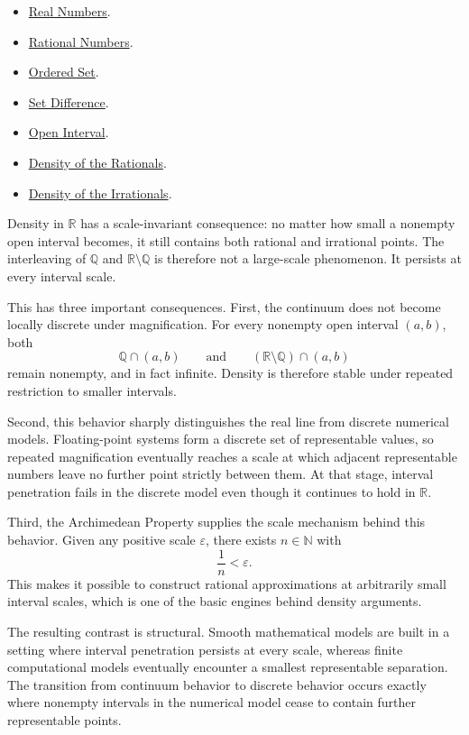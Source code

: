 \begin{dependencies}
\begin{itemize}
\item \hyperref[def:reals]{Real Numbers}.
\item \hyperref[def:rationals]{Rational Numbers}.
\item \hyperref[def:ordered-set]{Ordered Set}.
\item \hyperref[def:set-difference]{Set Difference}.
\item \hyperref[def:open-interval]{Open Interval}.
\item \hyperref[thm:density-of-rationals-in-reals]{Density of the Rationals}.
\item \hyperref[thm:density-of-irrationals-in-reals]{Density of the Irrationals}.
\end{itemize}
\end{dependencies}








\begin{exposition}
Density in $\mathbb{R}$ has a scale-invariant consequence: no matter how small a nonempty
open interval becomes, it still contains both rational and irrational points. The interleaving
of $\mathbb{Q}$ and $\mathbb{R}\setminus\mathbb{Q}$ is therefore not a large-scale phenomenon.
It persists at every interval scale.

This has three important consequences. First, the continuum does not become locally discrete
under magnification. For every nonempty open interval $(a,b)$, both
\[
\mathbb{Q}\cap(a,b)
\qquad\text{and}\qquad
(\mathbb{R}\setminus\mathbb{Q})\cap(a,b)
\]
remain nonempty, and in fact infinite. Density is therefore stable under repeated restriction
to smaller intervals.

Second, this behavior sharply distinguishes the real line from discrete numerical models.
Floating-point systems form a discrete set of representable values, so repeated magnification
eventually reaches a scale at which adjacent representable numbers leave no further point
strictly between them. At that stage, interval penetration fails in the discrete model even
though it continues to hold in $\mathbb{R}$.

Third, the Archimedean Property supplies the scale mechanism behind this behavior. Given any
positive scale $\varepsilon$, there exists $n\in\mathbb{N}$ with
\[
\frac{1}{n}<\varepsilon.
\]
This makes it possible to construct rational approximations at arbitrarily small interval
scales, which is one of the basic engines behind density arguments.

The resulting contrast is structural. Smooth mathematical models are built in a setting where
interval penetration persists at every scale, whereas finite computational models eventually
encounter a smallest representable separation. The transition from continuum behavior to
discrete behavior occurs exactly where nonempty intervals in the numerical model cease to
contain further \\representable points.
\end{exposition}


